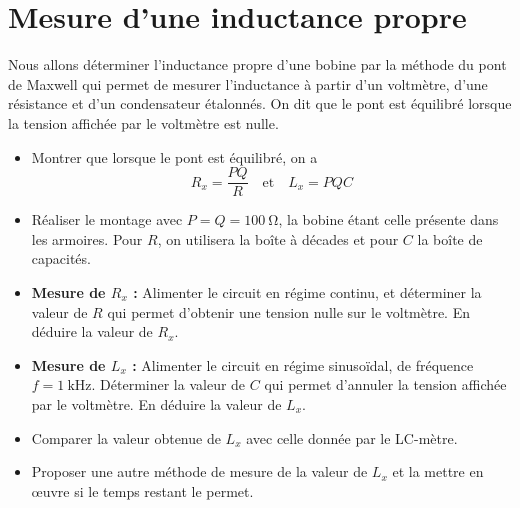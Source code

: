 \documentclass{tp}
\begin{document}
\section{Mesure d'une inductance propre}%
\label{sec:mesure_d_une_inductance_propre}

Nous allons déterminer l'inductance propre d'une bobine par la méthode du pont de Maxwell qui permet de mesurer l'inductance à partir d'un voltmètre, d'une résistance et d'un condensateur étalonnés. On dit que le pont est équilibré lorsque la tension affichée par le voltmètre est nulle.

\begin{center}
\end{center}
\begin{itemize}
  \item Montrer que lorsque le pont est équilibré, on a 
  \begin{equation}
    R_x = \frac{PQ}{R} \quad \text{et} \quad L_x = PQC
  \end{equation}

\item Réaliser le montage avec $P = Q = \SI{100}{\ohm}$, la bobine étant celle présente dans les armoires. Pour $R$, on utilisera la boîte à décades et pour $C$ la boîte de capacités.

\item \textbf{Mesure de $R_x$ :} Alimenter le circuit en régime continu, et déterminer la valeur de $R$ qui permet d'obtenir une tension nulle sur le voltmètre. En déduire la valeur de $R_x$.

\item \textbf{Mesure de $L_x$ :} Alimenter le circuit en régime sinusoïdal, de fréquence $f=\SI{1}{\kilo\hertz}$. Déterminer la valeur de $C$ qui permet d'annuler la tension affichée par le voltmètre. En déduire la valeur de $L_x$. 

\item Comparer la valeur obtenue de $L_x$ avec celle donnée par le LC-mètre. 

\item Proposer une autre méthode de mesure de la valeur de $L_x$ et la mettre en \oe{}uvre si le temps restant le permet.
\end{itemize}
\end{document}
